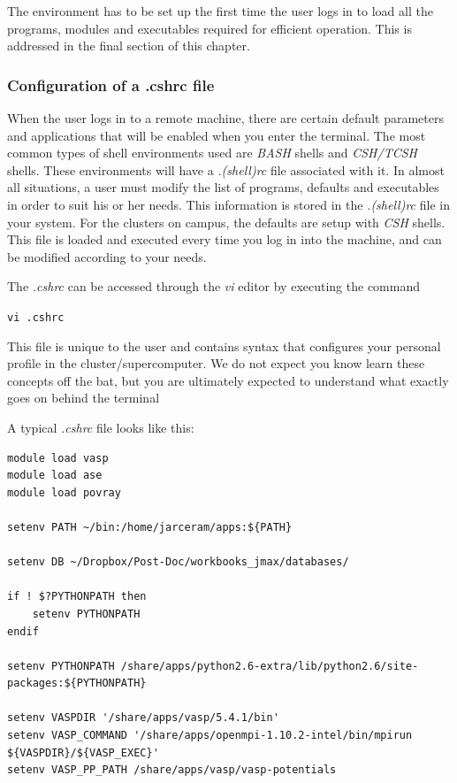 \documentclass[11pt]{article}
\begin{document}
The environment has to be set up the first time the user logs in to load
all the programs, modules and executables required for efficient
operation. This is addressed in the final section of this chapter.

    \subsubsection{Configuration of a .cshrc
file}\label{configuration-of-a-.cshrc-file}

When the user logs in to a remote machine, there are certain default
parameters and applications that will be enabled when you enter the
terminal. The most common types of shell environments used are
\emph{BASH} shells and \emph{CSH/TCSH} shells. These environments will
have a \emph{.(shell)rc} file associated with it. In almost all
situations, a user must modify the list of programs, defaults and
executables in order to suit his or her needs. This information is
stored in the \emph{.(shell)rc} file in your system. For the clusters on
campus, the defaults are setup with \emph{CSH} shells. This file is
loaded and executed every time you log in into the machine, and can be
modified according to your needs.

The \emph{.cshrc} can be accessed through the \emph{vi} editor by
executing the command

\texttt{vi\ .cshrc}

    This file is unique to the user and contains syntax that configures your
personal profile in the cluster/supercomputer. We do not expect you know
learn these concepts off the bat, but you are ultimately expected to
understand what exactly goes on behind the terminal

A typical \emph{.cshrc} file looks like this:

\begin{verbatim}
module load vasp
module load ase
module load povray

setenv PATH ~/bin:/home/jarceram/apps:${PATH}

setenv DB ~/Dropbox/Post-Doc/workbooks_jmax/databases/

if ! $?PYTHONPATH then
    setenv PYTHONPATH
endif

setenv PYTHONPATH /share/apps/python2.6-extra/lib/python2.6/site-packages:${PYTHONPATH}

setenv VASPDIR '/share/apps/vasp/5.4.1/bin'
setenv VASP_COMMAND '/share/apps/openmpi-1.10.2-intel/bin/mpirun ${VASPDIR}/${VASP_EXEC}'
setenv VASP_PP_PATH /share/apps/vasp/vasp-potentials
\end{verbatim}
\end{document}
